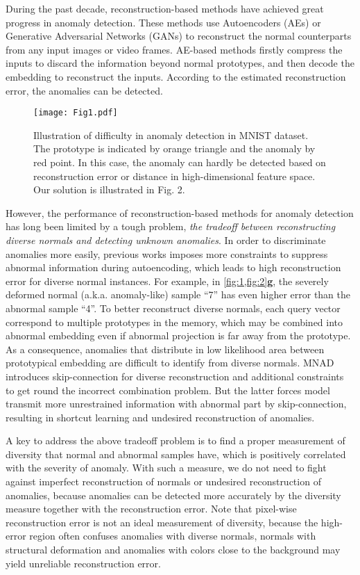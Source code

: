 \documentclass[10pt,twocolumn,letterpaper]{article}
\begin{document}
During the past decade, reconstruction-based methods have achieved great progress in anomaly detection. These methods use Autoencoders (AEs) \cite{convae2d,convae3d,convaelstm,memae,mnad,mpn,hf2vad} or Generative Adversarial Networks (GANs) \cite{framepred,gn,anogan} to reconstruct the normal counterparts from any input images or video frames. AE-based methods firstly compress the inputs to discard the information beyond normal prototypes, and then decode the embedding to reconstruct the inputs. According to the estimated reconstruction error, the anomalies can be detected.
\begin{figure}[t]
  \centering
  \texttt{[image: Fig1.pdf]}
  \caption{Illustration of difficulty in anomaly detection in MNIST dataset. The prototype is indicated by orange triangle and the anomaly by red point. In this case, the anomaly can hardly be detected based on reconstruction error or distance in high-dimensional feature space. Our solution is illustrated in Fig. 2.}
\vspace{-0.1em}
  \label{fig:1}
\end{figure}

However, the performance of reconstruction-based methods for anomaly detection has long been limited by a tough problem, \ie \textit{the tradeoff between reconstructing diverse normals and detecting unknown anomalies}.
In order to discriminate anomalies more easily, previous works \cite{memae} imposes more constraints to suppress abnormal information during autoencoding, which leads to high reconstruction error for diverse normal instances. For example, in \cref{fig:1,fig:2}\textbf{g}, the severely deformed normal (a.k.a. anomaly-like) sample ``7'' has even higher error than the abnormal sample ``4''. To better reconstruct diverse normals, each query vector correspond to multiple prototypes in the memory, which may be combined into abnormal embedding even if abnormal projection is far away from the prototype. As a consequence, anomalies that distribute in low likelihood area between prototypical embedding are difficult to identify from diverse normals. MNAD\cite{mnad} introduces skip-connection for diverse reconstruction and additional constraints to get round the incorrect combination problem. But the latter forces model transmit more unrestrained information with abnormal part by skip-connection, resulting in shortcut learning and undesired reconstruction of anomalies.

A key to address the above tradeoff problem is to find a proper measurement of diversity that normal and abnormal samples have, which is positively correlated with the severity of anomaly. With such a measure, we do not need to fight against imperfect reconstruction of normals or undesired reconstruction of anomalies, because anomalies can be detected more accurately by the diversity measure together with the reconstruction error. Note that pixel-wise reconstruction error is not an ideal measurement of diversity, because the high-error region often confuses anomalies with diverse normals, \eg normals with structural deformation and anomalies with colors close to the background may yield unreliable reconstruction error.
\end{document}
